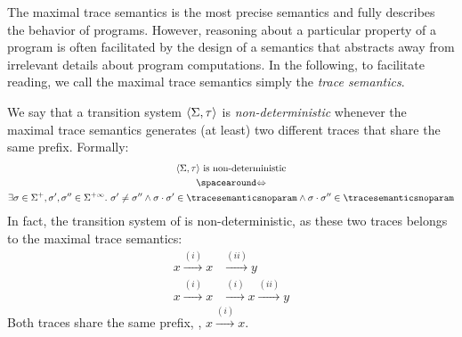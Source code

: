 
The maximal trace semantics is the most precise semantics and fully describes the behavior of programs. However, reasoning about a particular property of a program is often facilitated by the design of a semantics that abstracts away from irrelevant details about program computations.
In the following, to facilitate reading, we call the maximal trace semantics simply the \emph{trace semantics}.

\begin{remark}
  We say that a transition system $\langle \Sigma, \tau \rangle$ is \emph{non-deterministic} whenever the maximal trace semantics generates (at least) two different traces that share the same prefix. Formally:
  \begin{gather*}
    \transitionsystem \text{ is non-deterministic} \\ \IfF \\ \exists \deftrace \in \finitesequences, \deftrace', \deftrace'' \in \finiteinfinitesequences.\spacer \deftrace' \neq \deftrace'' \land \concat{\deftrace}{\deftrace'} \in \tracesemanticsnoparam \land \concat{\deftrace}{\deftrace''} \in \tracesemanticsnoparam
  \end{gather*}
  In fact, the transition system of  is non-deterministic, as these two traces belongs to the maximal trace semantics:
  \begin{align*}
    x \xrightarrow{(i)} x &\xrightarrow{(ii)} y\\
    x \xrightarrow{(i)} x &\xrightarrow{(i)} x \xrightarrow{(ii)} y
  \end{align*}
  Both traces share the same prefix, \ie, $x \xrightarrow{(i)} x$.
\end{remark}

